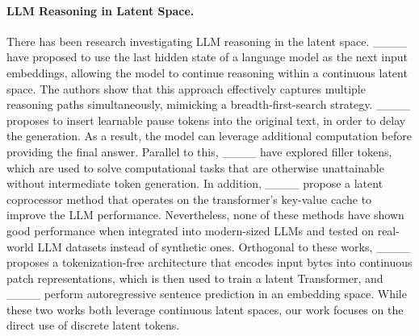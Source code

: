 \paragraph{LLM Reasoning in Latent Space.}
There has been research investigating LLM reasoning in the latent space. ____ have proposed to use the last hidden state of a language model as the next input embeddings, allowing the model to continue reasoning within a continuous latent space. The authors show that this approach effectively captures multiple reasoning paths simultaneously, mimicking a breadth-first-search strategy. ____ proposes to insert learnable pause tokens into the original text, in order to delay the generation. As a result, the model can leverage additional computation before providing the final answer. Parallel to this, ____ have explored filler tokens, which are used to solve computational tasks that are otherwise unattainable without intermediate token generation. 
In addition, ____ propose a latent coprocessor method that operates on the transformer's key-value cache to improve the LLM performance.  
Nevertheless, none of these methods have shown good performance when integrated into modern-sized LLMs and tested on real-world LLM datasets instead of synthetic ones.
Orthogonal to these works, ____ proposes a tokenization-free architecture that encodes input bytes into continuous patch representations, which is then used to train a latent Transformer, and ____ perform autoregressive sentence prediction in an embedding space. While these two works both leverage continuous latent spaces, our work focuses on the direct use of discrete latent tokens.